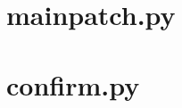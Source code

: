 \documentclass[10pt, a4paper, onecolumn, twoside]{article}
\begin{document}
\section{mainpatch.py}


\pagebreak

\section{confirm.py}

\end{document}
